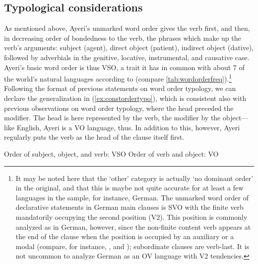 \subsection{Typological considerations}
\label{sec:verbtypo}

As mentioned above, Ayeri's unmarked word order gives the verb first, and then,
in decreasing order of bondedness to the verb, the phrases which make up the
verb's arguments: subject (agent), direct object (patient), indirect object
(dative), followed by adverbials in the genitive, locative, instrumental, and
causative case. Ayeri's basic word order is thus VSO, a trait it has in common
with about 7\pct{} of the world's natural languages according to \citet{wals81}
(compare \autoref{tab:wordorderfreq}).\footnote{It may be noted here that the
`other' category is actually `no dominant order' in the original, and that this
is maybe not quite accurate for at least a few languages in the sample, for
instance, German. The unmarked word order of declarative statements in German
main clauses is SVO with the finite verb mandatorily occupying the second
position (V2). This position is commonly analyzed as  in German,
however, since the non-finite content verb  appears at the end of the
clause when the  position is occupied by an auxiliary or a modal
(compare, for instance, \cite[375--379, 447--450]{bresnan2016}, and
\cite{fortmann2006}); subordinate clauses are verb-last. It is not uncommon to
analyze German as an OV language with V2 tendencies.} Following the format of
previous statements on word order typology, we can declare the generalization
in (\ref{ex:constordertypo}), which is consistent also with previous
observations on word order typology, where the head preceded the modifier. The
head is here represented by the verb, the modifier by the object---like
English, Ayeri is a VO language, thus. In addition to this, however, Ayeri
regularly puts the verb as the head of the clause itself first.

\pex\label{ex:constordertypo}
\a Order of subject, object, and verb: VSO
\a Order of verb and object: VO
\xe


